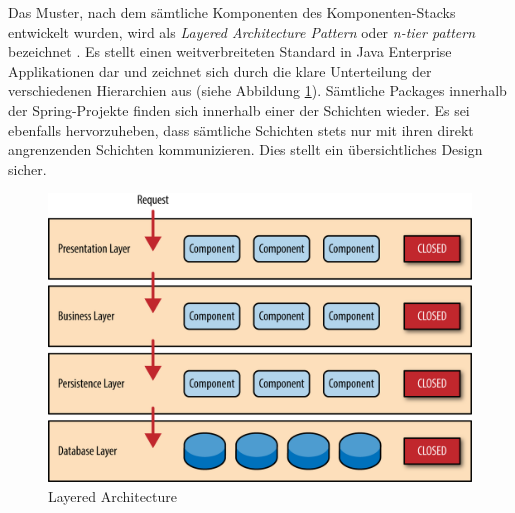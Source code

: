 Das Muster, nach dem sämtliche Komponenten des Komponenten-Stacks entwickelt wurden, wird als \emph{Layered Architecture Pattern} oder \emph{n-tier pattern} bezeichnet \cite{oreilly-layered-arch}. Es stellt einen weitverbreiteten Standard in Java Enterprise Applikationen dar und zeichnet sich durch die klare Unterteilung der verschiedenen Hierarchien aus (siehe Abbildung \ref{fig:layeredArchitecture}). Sämtliche Packages innerhalb der Spring-Projekte finden sich innerhalb einer der Schichten wieder. Es sei ebenfalls hervorzuheben, dass sämtliche Schichten stets nur mit ihren direkt angrenzenden Schichten kommunizieren. Dies stellt ein übersichtliches Design sicher.

\begin{figure}[ht!]
	\centering
	\includegraphics[width=.7\linewidth]{kapitel/problemloesung/implementierung/_img/dataflow-overview-01}
	\caption[Layered Architecture]{Layered Architecture \cite{oreilly-layered-arch}}
	\label{fig:layeredArchitecture}
\end{figure}


